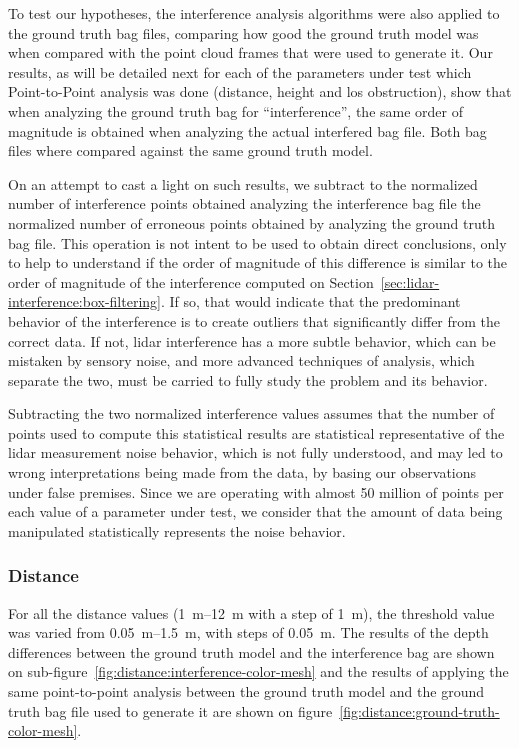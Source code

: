 To test our hypotheses, the interference analysis algorithms were also applied to the ground truth bag files, comparing how good the ground truth model was when compared with the point cloud frames that were used to generate it. Our results, as will be detailed next for each of the parameters under test which Point-to-Point analysis was done (distance, height and \ac{los} obstruction), show that when analyzing the ground truth bag for ``interference'', the same order of magnitude is obtained when analyzing the actual interfered bag file. Both bag files where compared against the same ground truth model.

On an attempt to cast a light on such results, we subtract to the normalized number of interference points obtained analyzing the interference bag file the normalized number of erroneous points obtained by analyzing the ground truth bag file. This operation is not intent to be used to obtain direct conclusions, only to help to understand if the order of magnitude of this difference is similar to the order of magnitude of the interference computed on Section~\ref{sec:lidar-interference:box-filtering}. If so, that would indicate that the predominant behavior of the interference is to create outliers that significantly differ from the correct data. If not, \ac{lidar} interference has a more subtle behavior, which can be mistaken by sensory noise, and more advanced techniques of analysis, which separate the two, must be carried to fully study the problem and its behavior.

Subtracting the two normalized interference values assumes that the number of points used to compute this statistical results are statistical representative of the \ac{lidar} measurement noise behavior, which is not fully understood, and may led to wrong interpretations being made from the data, by basing our observations under false premises. Since we are operating with almost 50 million of points per each value of a parameter under test, we consider that the amount of data being manipulated statistically represents the noise behavior.

\subsubsection{Distance}
For all the distance values (\SIrange{1}{12}{\meter} with a step of \SI{1}{\meter}), the threshold value was varied from \SIrange{0.05}{1.5}{\meter}, with steps of \SI{0.05}{\meter}. The results of the depth differences between the ground truth model and the interference bag are shown on sub-figure~\ref{fig:distance:interference-color-mesh} and the results of applying the same point-to-point analysis between the ground truth model and the ground truth bag file used to generate it are shown on figure~\ref{fig:distance:ground-truth-color-mesh}.

